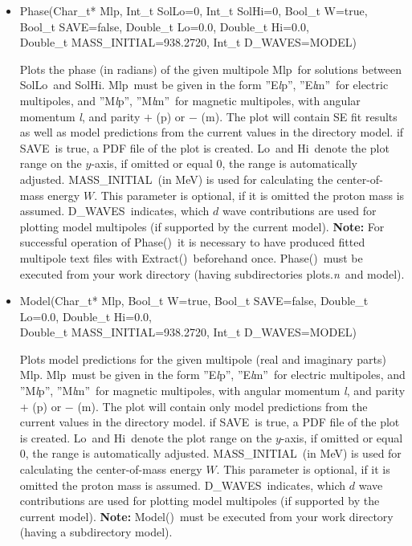 \documentclass[a4paper,10pt]{article}
\def\tt{\ttfamily}
\def\rm{\rmfamily}
\begin{document}
\begin{itemize}
\item
\tt Phase(Char\_t* Mlp, Int\_t SolLo=0, Int\_t SolHi=0, Bool\_t W=true,\\
\phantom{Phase(}Bool\_t SAVE=false, Double\_t Lo=0.0, Double\_t Hi=0.0,\\
\phantom{Phase(}Double\_t MASS\_INITIAL=938.2720, Int\_t D\_WAVES=MODEL)\rm

Plots the phase (in radians) of the given multipole \tt Mlp\rm\ for solutions between \tt SolLo\rm\ and \tt SolHi\rm.
\tt Mlp\rm\ must be given in the form \tt ''E\textit{l}p''\rm,
\tt ''E\textit{l}m''\rm\ 
for electric multipoles, and
\tt ''M\textit{l}p''\rm,
\tt ''M\textit{l}m''\rm\ 
for magnetic multipoles, with angular momentum \tt\textit{l}\rm, and parity
$+$ (\tt p\rm) or $-$ (\tt m\rm). The plot will contain SE fit results as well as model predictions from the current
values in the directory \tt model\rm.
if \tt SAVE\rm\ is true, a PDF file of the plot is created. \tt Lo\rm\ and \tt Hi\rm\ denote the plot range on the $y$-axis, 
if omitted or equal 0, the range is automatically adjusted.
\tt MASS\_INITIAL\rm\ (in MeV) is used for calculating the center-of-mass energy $W$. This parameter 
is optional, if it is omitted the proton mass is assumed.
\tt D\_WAVES\rm\ indicates, which $d$ wave contributions are used for plotting model multipoles (if supported by the current model).
\textbf{Note:} For successful operation of \tt Phase()\rm\ it is necessary to have produced
fitted multipole text files with \tt Extract()\rm\ beforehand once. \tt Phase()\rm\ must be executed from your
work directory (having subdirectories \tt plots.\textit{n}\rm\ and \tt model\rm).

\item
\tt Model(Char\_t* Mlp, Bool\_t W=true, Bool\_t SAVE=false, Double\_t Lo=0.0, Double\_t Hi=0.0,\\
\phantom{Model(}Double\_t MASS\_INITIAL=938.2720, Int\_t D\_WAVES=MODEL)\rm

Plots model predictions for the given multipole (real and imaginary parts) \tt Mlp\rm.
\tt Mlp\rm\ must be given in the form \tt ''E\textit{l}p''\rm,
\tt ''E\textit{l}m''\rm\ 
for electric multipoles, and
\tt ''M\textit{l}p''\rm,
\tt ''M\textit{l}m''\rm\ 
for magnetic multipoles, with angular momentum \tt\textit{l}\rm, and parity
$+$ (\tt p\rm) or $-$ (\tt m\rm). The plot will contain only model predictions from the current
values in the directory \tt model\rm.
if \tt SAVE\rm\ is true, a PDF file of the plot is created. \tt Lo\rm\ and \tt Hi\rm\ denote the plot range on the $y$-axis, 
if omitted or equal 0, the range is automatically adjusted.
\tt MASS\_INITIAL\rm\ (in MeV) is used for calculating the center-of-mass energy $W$. This parameter 
is optional, if it is omitted the proton mass is assumed.
\tt D\_WAVES\rm\ indicates, which $d$ wave contributions are used for plotting model multipoles (if supported by the current model).
\textbf{Note:}  \tt Model()\rm\ must be executed from your
work directory (having a subdirectory \tt model\rm).



\end{itemize}
\end{document}
